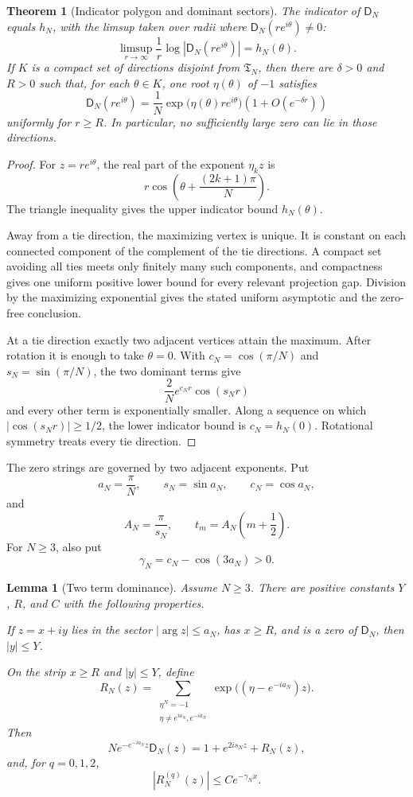 \documentclass[11pt]{article}
\newtheorem{theorem}{Theorem}[section]
\newtheorem{lemma}[lemma]{Lemma}
\theoremstyle{definition}
\theoremstyle{remark}
\newcommand{\Dfun}{\mathsf D}
\begin{document}
\begin{theorem}[Indicator polygon and dominant sectors]\label{thm:indicator_polygon}
The indicator of $\Dfun_N$ equals $h_N$, with the limsup taken over radii where $\Dfun_N(re^{i\theta})\ne0$:
\[
\limsup_{r\to\infty}
\frac1r\log|\Dfun_N(re^{i\theta})|
=
h_N(\theta).
\]
If $K$ is a compact set of directions disjoint from $\mathfrak T_N$, then there are $\delta>0$ and $R>0$ such that, for each $\theta\in K$, one root $\eta(\theta)$ of $-1$ satisfies
\[
\Dfun_N(re^{i\theta})
=
\frac1N
\exp\bigl(\eta(\theta)re^{i\theta}\bigr)
\left(1+O(e^{-\delta r})\right)
\]
uniformly for $r\geq R$.  In particular, no sufficiently large zero can lie in those directions.
\end{theorem}

\begin{proof}
For $z=re^{i\theta}$, the real part of the exponent $\eta_kz$ is
\[
r\cos\left(\theta+\frac{(2k+1)\pi}{N}\right).
\]
The triangle inequality gives the upper indicator bound $h_N(\theta)$.

Away from a tie direction, the maximizing vertex is unique.  It is constant
on each connected component of the complement of the tie directions.  A
compact set avoiding all ties meets only finitely many such components, and
compactness gives one uniform positive lower bound for every relevant
projection gap.  Division by the maximizing exponential gives the stated
uniform asymptotic and the zero-free conclusion.

At a tie direction exactly two adjacent vertices attain the maximum.  After rotation it is enough to take $\theta=0$.  With $c_N=\cos(\pi/N)$ and $s_N=\sin(\pi/N)$, the two dominant terms give
\[
\frac2N e^{c_Nr}\cos(s_Nr)
\]
and every other term is exponentially smaller.  Along a sequence on which $|\cos(s_Nr)|\geq1/2$, the lower indicator bound is $c_N=h_N(0)$.  Rotational symmetry treats every tie direction.
\end{proof}

The zero strings are governed by two adjacent exponents.  Put
\[
a_N=\frac\pi N,
\qquad
s_N=\sin a_N,
\qquad
c_N=\cos a_N,
\]
and
\[
A_N=\frac\pi{s_N},
\qquad
 t_m=A_N\left(m+\frac12\right).
\]
For $N\geq3$, also put
\[
\gamma_N=c_N-\cos(3a_N)>0.
\]

\begin{lemma}[Two term dominance]\label{lem:two_term_dominance}
Assume $N\geq3$.  There are positive constants $Y$, $R$, and $C$ with the following properties.

If $z=x+iy$ lies in the sector $|\arg z|\leq a_N$, has $x\geq R$, and is a zero of $\Dfun_N$, then $|y|\leq Y$.

On the strip $x\geq R$ and $|y|\leq Y$, define
\[
R_N(z)
=
\sum_{\substack{\eta^N=-1\\
\eta\ne e^{ia_N},e^{-ia_N}}}
\exp\bigl((\eta-e^{-ia_N})z\bigr).
\]
Then
\[
N e^{-e^{-ia_N}z}\Dfun_N(z)
=
1+e^{2is_Nz}+R_N(z),
\]
and, for $q=0,1,2$,
\[
|R_N^{(q)}(z)|
\leq
C e^{-\gamma_Nx}.
\]
\end{lemma}
\end{document}
